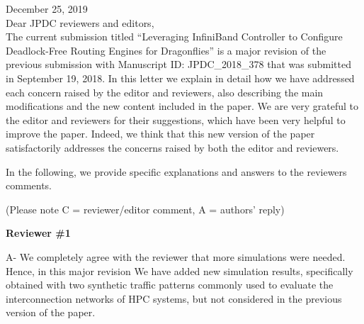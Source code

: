 \documentclass[a4paper,10pt]{letter}
\begin{document}

\clearpage
\thispagestyle{empty}

\begin{letter}
\address{German~Maglione-Mathey\\ Jesus~Escudero-Sahuquillo\\ Pedro~Javier~Garcia\\Francisco~J.~Quiles\\Eitan Zahavi\\}

December 25, 2019\\

Dear JPDC reviewers and editors, \\

The current submission titled ``Leveraging InfiniBand Controller to Configure Deadlock-Free Routing Engines
for Dragonflies'' is a major revision
of the previous submission with Manuscript ID: JPDC\_2018\_378 that was submitted in September 19, 2018.
In this letter we explain in detail how we have addressed each concern raised by the editor and reviewers,
also describing the main modifications and the new content included in the paper.
We are very grateful to the editor and reviewers for their suggestions, which have been very helpful to improve the paper.
Indeed, we think that this new version of the paper satisfactorily addresses the concerns raised by both the editor and  reviewers.

In the following, we provide specific explanations and answers to the reviewers comments.

(Please note C = reviewer/editor comment, A = authors' reply)

{\bf Reviewer \#1}


A- We completely agree with the reviewer that more simulations were needed. Hence, in this major revision We have added new simulation results, specifically obtained with two synthetic traffic patterns commonly used to evaluate the interconnection networks of HPC systems, but not considered in the previous version of the paper.


\end{letter}
\end{document}
